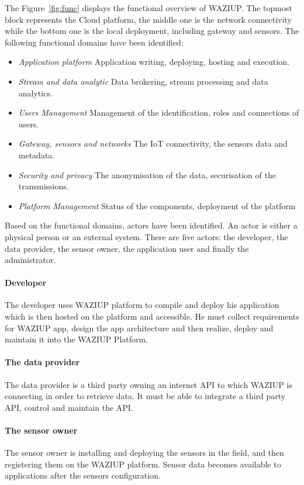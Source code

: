 The Figure~\ref{fig:func} displays the functional overview of WAZIUP.
The topmost block represents the Cloud platform, the middle one is the network connectivity while the bottom one is the local deployment, including gateway and sensors.
The following functional domains have been identified:

\begin{itemize}
  \item \emph{Application platform}
	Application writing, deploying, hosting and execution.
  \item \emph{Stream and data analytic}
	Data brokering, stream processing and data analytics.
  \item \emph{Users Management}
	Management of the identification, roles and connections of users.
  \item \emph{Gateway, sensors and networks}
	The IoT connectivity, the sensors data and metadata.
  \item \emph{Security and privacy}
	The anonymisation of the data, securisation of the transmissions.
  \item \emph{Platform Management}
	Status of the components, deployment of the platform
\end{itemize}

Based on the functional domains, actors have been identified. 
An actor is either a physical person or an external system. 
There are five actors: the developer, the data provider, the sensor owner, the application user and finally the administrator.

\paragraph{Developer}
The developer uses WAZIUP platform to compile and deploy his application which is then hosted on the platform and accessible. He must collect requirements for WAZIUP app, design the app architecture and then realize, deploy and maintain it into the WAZIUP Platform. 

\paragraph{The data provider}
The data provider is a third party owning an internet API to which WAZIUP is connecting in order to retrieve data. It must be able to integrate a third party API, control and maintain the API. 

\paragraph{The sensor owner }
The sensor owner is installing and deploying the sensors in the field, and then registering them on the WAZIUP platform. Sensor data becomes available to applications after the sensors configuration.

